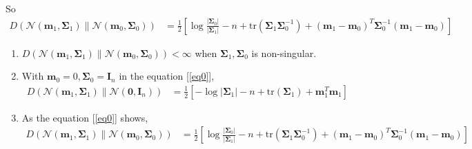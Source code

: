 \documentclass[a4paper]{article}
\begin{document}
\begin{enumerate}
    So 
    \begin{equation}\label{eq0}
      \begin{aligned}
        D\left(\mathcal{N}\left(\boldsymbol{m}_{1}, \boldsymbol{\Sigma}_{1}\right) \| \mathcal{N}\left(\boldsymbol{m}_{0}, \boldsymbol{\Sigma}_{0}\right)\right) & = \frac{1}{2} \left[\log \frac{\left|\boldsymbol{\Sigma}_{0}\right|}{\left|\boldsymbol{\Sigma}_{1}\right|}-n+\text{tr}\left(\boldsymbol{\Sigma}_{1}\boldsymbol{\Sigma}_{0}^{-1}\right) + \left(\boldsymbol{m}_{1}-\boldsymbol{m}_{0}\right)^{T}\boldsymbol{\Sigma}_{0}^{-1}\left(\boldsymbol{m}_{1}-\boldsymbol{m}_{0}\right) \right]
      \end{aligned}
    \end{equation}


    \begin{enumerate}
      \item $D\left(\mathcal{N}\left(\boldsymbol{m}_{1}, \boldsymbol{\Sigma}_{1}\right) \| \mathcal{N}\left(\boldsymbol{m}_{0}, \boldsymbol{\Sigma}_{0}\right)\right) < \infty$  when $\boldsymbol{\Sigma}_{1},\boldsymbol{\Sigma}_{0}$ is non-singular.
      \item With $\boldsymbol{m}_0 = 0,\boldsymbol{\Sigma}_0 = \boldsymbol{I}_n$ in the equation [\ref{eq0}],
      \begin{equation}
        \begin{aligned}
          D\left(\mathcal{N}\left(\boldsymbol{m}_{1}, \boldsymbol{\Sigma}_{1}\right) \| \mathcal{N}\left(\boldsymbol{0}, \boldsymbol{I}_{n}\right)\right) & = \frac{1}{2} \left[ - \log \left|\boldsymbol{\Sigma}_{1}\right|-n+\text{tr}\left(\boldsymbol{\Sigma}_{1}\right) + \boldsymbol{m}_{1}^{T}\boldsymbol{m}_{1} \right]
        \end{aligned}
      \end{equation}

      \item As the equation [\ref{eq0}] shows,
      \begin{equation}
        \begin{aligned}
          D\left(\mathcal{N}\left(\boldsymbol{m}_{1}, \boldsymbol{\Sigma}_{1}\right) \| \mathcal{N}\left(\boldsymbol{m}_{0}, \boldsymbol{\Sigma}_{0}\right)\right) & = \frac{1}{2} \left[\log \frac{\left|\boldsymbol{\Sigma}_{0}\right|}{\left|\boldsymbol{\Sigma}_{1}\right|}-n+\text{tr}\left(\boldsymbol{\Sigma}_{1}\boldsymbol{\Sigma}_{0}^{-1}\right) + \left(\boldsymbol{m}_{1}-\boldsymbol{m}_{0}\right)^{T}\boldsymbol{\Sigma}_{0}^{-1}\left(\boldsymbol{m}_{1}-\boldsymbol{m}_{0}\right) \right]
        \end{aligned}
      \end{equation}
    \end{enumerate}


\end{enumerate}
\end{document}

